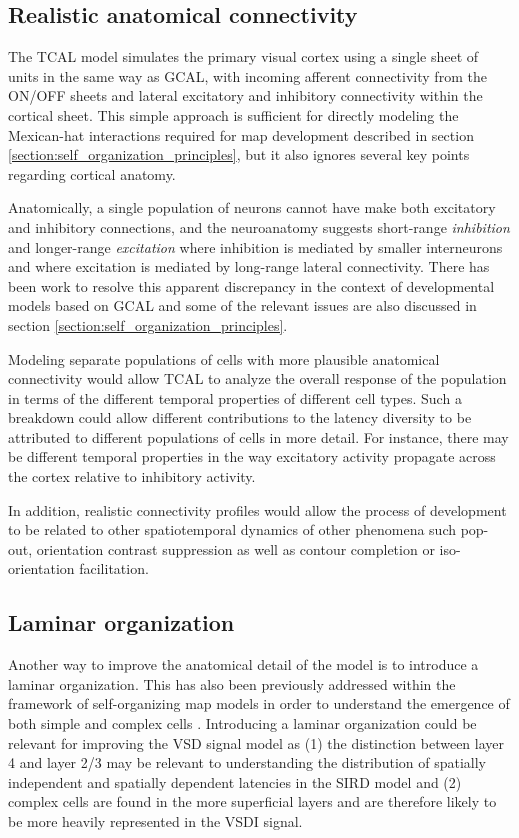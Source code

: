 \documentclass[phd,ianc,twoside]{infthesis}
\begin{document}
\subsection{Realistic anatomical connectivity}
\label{section:future_work_anatomy}

The TCAL model simulates the primary visual cortex using a single sheet
of units in the same way as GCAL, with incoming afferent connectivity
from the ON/OFF sheets and lateral excitatory and inhibitory
connectivity within the cortical sheet. This simple approach is
sufficient for directly modeling the Mexican-hat interactions required
for map development described in section
\ref{section:self_organization_principles}, but it also ignores several
key points regarding cortical anatomy.

Anatomically, a single population of neurons cannot have make both excitatory
and inhibitory connections, and the neuroanatomy
suggests short-range \emph{inhibition} and longer-range \emph{excitation}
where inhibition is mediated by smaller interneurons and where
excitation is mediated by long-range lateral connectivity. There has
been work to resolve this apparent discrepancy in the context of
developmental models based on GCAL \citep{law_thesis09,rudiger_thesis16} and
some of the relevant issues are also discussed in section \ref{section:self_organization_principles}.

Modeling separate populations of cells with more plausible anatomical
connectivity would allow TCAL to analyze the overall response of the
population in terms of the different temporal properties of different
cell types. Such a breakdown could allow different contributions to the
latency diversity to be attributed to different populations of cells in
more detail. For instance, there may be different temporal properties in
the way excitatory activity propagate across the cortex relative to
inhibitory activity.

In addition, realistic connectivity profiles would allow the process of
development to be related to other spatiotemporal dynamics of other
phenomena such pop-out, orientation contrast suppression as well as
contour completion or iso-orientation facilitation.

\subsection{Laminar organization}
\label{section:future_work_laminar}

Another way to improve the anatomical detail of the model is to
introduce a laminar organization. This has also been previously
addressed within the framework of self-organizing map models in order to
understand the emergence of both simple and complex cells
\citep{antolik_fncom}. Introducing a laminar organization could be
relevant for improving the VSD signal model as (1) the distinction
between layer 4 and layer 2/3 may be relevant to understanding the
distribution of spatially independent and spatially dependent latencies
in the SIRD model and (2) complex cells are found in the more
superficial layers and are therefore likely to be more heavily
represented in the VSDI signal.
\end{document}
